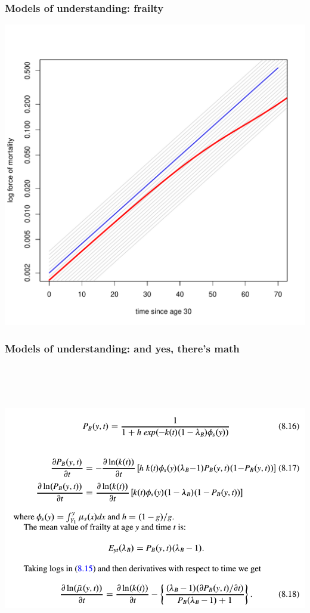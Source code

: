 \documentclass[20pt]{beamer}
\begin{document}
\begin{frame}
\frametitle{Models of understanding: frailty}
\vspace{-2em}
\begin{center}
\includegraphics{Figures/Frailty5.pdf}
\end{center}
\end{frame}

\begin{frame}
\frametitle{Models of understanding: and yes, there's math}
\vspace{-2em}
\begin{center}
\includegraphics[height=5in]{Figures/PalloniShot.png}
\end{center}
\color{mygray}{screenshot from Palloni \& Beltran-Sanchez (2016)}
\end{frame}
\end{document}
